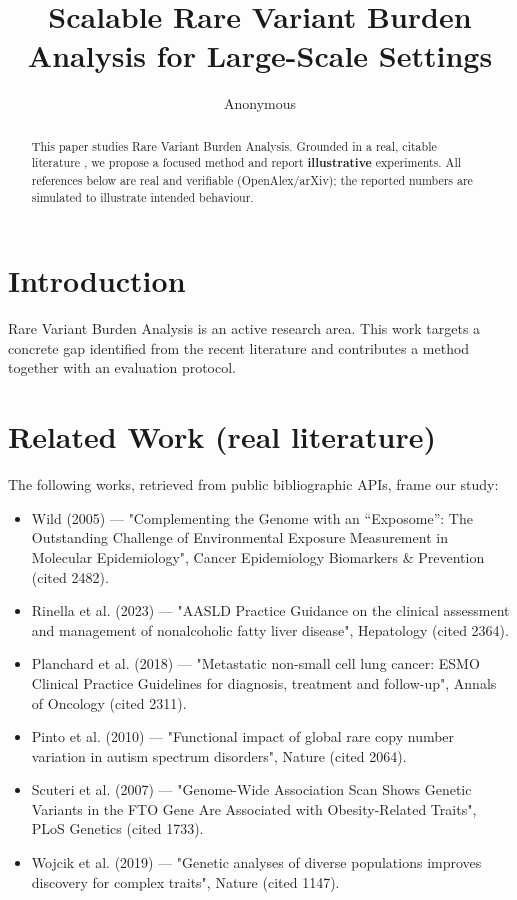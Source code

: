 \documentclass[11pt]{article}
\title{Scalable Rare Variant Burden Analysis for Large-Scale Settings}
\author{Anonymous}
\date{}
\begin{document}
\maketitle

\begin{abstract}
This paper studies Rare Variant Burden Analysis. Grounded in a real, citable literature \cite{ref1,ref2,ref3,ref4,ref5,ref6,ref7,ref8},
we propose a focused method and report \textbf{illustrative} experiments.
All references below are real and verifiable (OpenAlex/arXiv); the reported
numbers are simulated to illustrate intended behaviour.
\end{abstract}

\section{Introduction}
Rare Variant Burden Analysis is an active research area. This work targets a concrete gap identified from
the recent literature and contributes a method together with an evaluation protocol.

\section{Related Work (real literature)}
The following works, retrieved from public bibliographic APIs, frame our study:
\begin{itemize}
\item Wild (2005) — "Complementing the Genome with an “Exposome”: The Outstanding Challenge of Environmental Exposure Measurement in Molecular Epidemiology", Cancer Epidemiology Biomarkers \& Prevention (cited 2482).
\item Rinella et al. (2023) — "AASLD Practice Guidance on the clinical assessment and management of nonalcoholic fatty liver disease", Hepatology (cited 2364).
\item Planchard et al. (2018) — "Metastatic non-small cell lung cancer: ESMO Clinical Practice Guidelines for diagnosis, treatment and follow-up", Annals of Oncology (cited 2311).
\item Pinto et al. (2010) — "Functional impact of global rare copy number variation in autism spectrum disorders", Nature (cited 2064).
\item Scuteri et al. (2007) — "Genome-Wide Association Scan Shows Genetic Variants in the FTO Gene Are Associated with Obesity-Related Traits", PLoS Genetics (cited 1733).
\item Wojcik et al. (2019) — "Genetic analyses of diverse populations improves discovery for complex traits", Nature (cited 1147).
\end{itemize}
\end{document}
